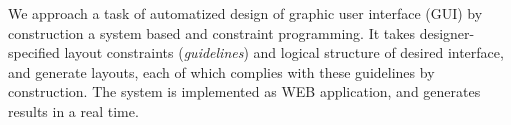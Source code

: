 
We approach a task of automatized design of  graphic user interface (GUI) by construction a system based and constraint programming.
It takes designer-specified layout constraints (\emph{guidelines}) and  logical structure of desired interface, and generate layouts,
each of which complies with these guidelines by construction.
The system is implemented as WEB application, and generates results in a real time.
